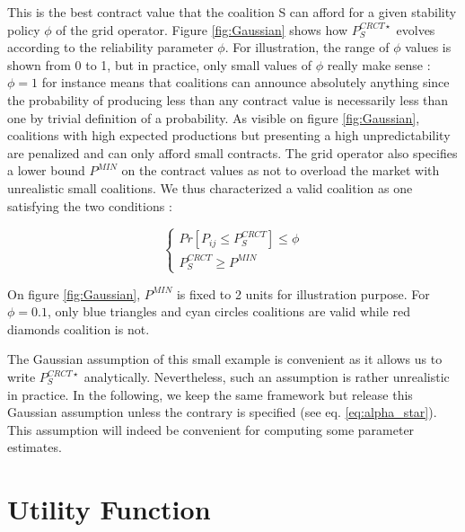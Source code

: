\documentclass[journal]{IEEEtran}
\begin{document}
This is the best contract value that the coalition S can afford for a given stability policy $\phi$ of the grid operator. Figure \ref{fig:Gaussian} shows how $ P_{S}^{CRCT \star} $ evolves according to the reliability parameter $ \phi $. For illustration, the range of $ \phi $ values is shown from 0 to 1, but in practice, only small values of $ \phi $ really make sense : $ \phi = 1 $ for instance means that coalitions can announce absolutely anything since the probability of producing less than any contract value is necessarily less than one by trivial definition of a probability. As visible on figure \ref{fig:Gaussian}, coalitions with high expected productions but presenting a high unpredictability are penalized and can only afford small contracts. The grid operator also specifies a lower bound $ P^{MIN} $ on the contract values as not to overload the market with unrealistic small coalitions. We thus characterized a valid coalition as one satisfying the two conditions :

\begin{equation}
\left\{ \begin{array}{lll}
			Pr[P_{ij} \leq P_{S}^{CRCT}] \leq \phi \\
			P_{S}^{CRCT} \geq P^{MIN}
\end{array} \right.
\end{equation}

On figure \ref{fig:Gaussian}, $ P^{MIN} $ is fixed to 2 units for illustration purpose. For $ \phi = 0.1 $, only blue triangles and cyan circles coalitions are valid while red diamonds coalition is not.

The Gaussian assumption of this small example is convenient as it allows us to write $ P_{S}^{CRCT \star} $ analytically. Nevertheless, such an assumption is rather unrealistic in practice. In the following, we keep the same framework but release this Gaussian assumption unless the contrary is specified (see eq. \ref{eq:alpha_star}). This assumption will indeed be convenient for computing some parameter estimates.

%
%

\section{Utility Function}
\label{sec:utility}
\end{document}
